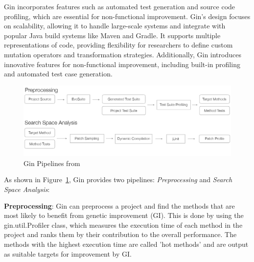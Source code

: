 \vspace{.5em}
Gin incorporates features such as automated test generation and source code profiling, which are essential for non-functional improvement. Gin's design focuses on scalability, allowing it to handle large-scale systems and integrate with popular Java build systems like Maven and Gradle. It supports multiple representations of code, providing flexibility for researchers to define custom mutation operators and transformation strategies. Additionally, Gin introduces innovative features for non-functional improvement, including built-in profiling and automated test case generation.\par


\begin{figure}[h]
  \centering
  \includegraphics[width=1.0\textwidth]{img/Gin_Pipelines.png}
  \caption{Gin Pipelines from~\cite{DBLP:conf/gecco/BrownleePABWW19}}
  \label{fig:GinPipelines}
\end{figure}


As shown in Figure~\ref{fig:GinPipelines}, Gin provides two pipelines: \textit{Preprocessing} and \textit{Search Space Analysis}:\par

\vspace{.5em}
\textbf{Preprocessing}: Gin can preprocess a project and find the methods that are most likely to benefit from genetic improvement (GI). This is done by using the gin.util.Profiler class, which measures the execution time of each method in the project and ranks them by their contribution to the overall performance. The methods with the highest execution time are called 'hot methods' and are output as suitable targets for improvement by GI.\par

